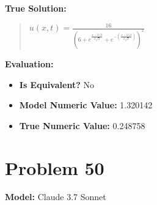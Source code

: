 \documentclass{article}
\begin{document}
\textbf{True Solution:}
\begin{quote}
$u(x,t) = \frac{16}{\left(6 + e^{\frac{x-0.5t}{2\sqrt{2}}} + e^{-\left(\frac{x-0.5t}{2\sqrt{2}}\right)}\right)^2}$
\end{quote}

\textbf{Evaluation:}
\begin{itemize}
\item \textbf{Is Equivalent?} No
\item \textbf{Model Numeric Value:} 1.320142
\item \textbf{True Numeric Value:} 0.248758
\end{itemize}
\vspace{1cm}
\section*{Problem 50}
\textbf{Model:} Claude 3.7 Sonnet
\end{document}
